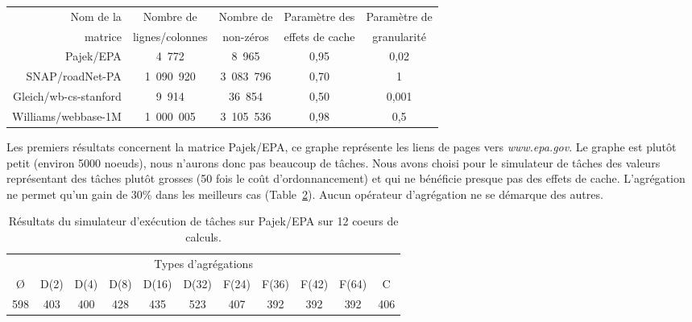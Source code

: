 \begin{table}[h!]
\begin{center}
  \begin{tabular}{|r|c|c|c|c|}
    \hline
    Nom de la & Nombre de       & Nombre de & Paramètre des   & Paramètre de\\
    matrice   & lignes/colonnes & non-zéros & effets de cache & granularité \\
    \hline
    Pajek/EPA             & 4~772     & 8~965     & 0,95 & 0,02  \\
    SNAP/roadNet-PA       & 1~090~920 & 3~083~796 & 0,70 & 1     \\
    Gleich/wb-cs-stanford & 9~914     & 36~854    & 0,50 & 0,001 \\
    Williams/webbase-1M   & 1~000~005 & 3~105~536 & 0,98 & 0,5   \\
    \hline
  \end{tabular}
  \label{tab:florida}
\end{center}
\end{table}


Les premiers résultats concernent la matrice Pajek/EPA, ce graphe représente les liens de pages vers {\em www.epa.gov}.
%
Le graphe est plutôt petit (environ 5000 noeuds), nous n'aurons donc pas beaucoup de tâches.
%
Nous avons choisi pour le simulateur de tâches des valeurs représentant des tâches plutôt grosses (50 fois le coût d'ordonnancement) et qui ne bénéficie presque pas des effets de cache.
%
L'agrégation ne permet qu'un gain de 30\% dans les meilleurs cas (Table~\ref{tab:epa}).
%
Aucun opérateur d'agrégation ne se démarque des autres.

\begin{table}[h!]
  \begin{center}
    \begin{tabular}{|c|c|c|c|c|c|c|c|c|c|c|}
      \hline
      \multicolumn{11}{|c|}{Types d'agrégations}\\
      \O & D(2) & D(4) & D(8) & D(16) & D(32) & F(24) & F(36) & F(42) & F(64) & C \\
      \hline
      598 & 403 & 400 & 428 & 435 & 523 & 407 & 392 & 392 & 392 & 406 \\
      \hline
    \end{tabular}
    \caption{Résultats du simulateur d'exécution de tâches sur Pajek/EPA sur 12 coeurs de calculs.}
    \label{tab:epa}
  \end{center}
\end{table}


